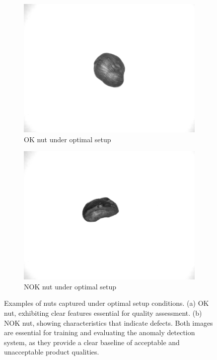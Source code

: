 \documentclass[12pt,DIV14,BCOR12mm,a4paper,footinclude=false,headinclude,parskip=half-,twoside,openright,cleardoublepage=empty,toc=index,bibliography=totoc,listof=totoc]{scrreprt}
\numberwithin{equation}{chapter}
\begin{document}
\begin{figure}
    \centering
    \begin{subfigure}[b]{0.45\textwidth}
        \centering
        \includegraphics[scale=0.15]{../media/Nuts-Optimal-OK.png}
        \caption{OK nut under optimal setup}
        \label{fig:nut_ok}
    \end{subfigure}
    \hfill
    \begin{subfigure}[b]{0.45\textwidth}
        \centering
        \includegraphics[scale=0.15]{../media/Nuts-optimal-NOK.png}
        \caption{NOK nut under optimal setup}
        \label{fig:nut_nok}
    \end{subfigure}
    \caption{Examples of nuts captured under optimal setup conditions. (a) OK nut, exhibiting clear features essential for quality assessment. (b) NOK nut, showing characteristics that indicate defects. Both images are essential for training and evaluating the anomaly detection system, as they provide a clear baseline of acceptable and unacceptable product qualities.}
    \label{fig:optimal_setup}
\end{figure}
\end{document}
